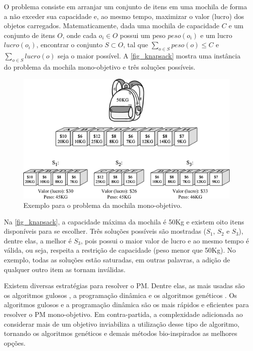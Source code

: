 O problema consiste em arranjar um conjunto de itens em uma mochila de forma a não exceder sua capacidade e, ao mesmo tempo, maximizar o valor (lucro) dos objetos carregados. Matematicamente, dada uma mochila de capacidade $C$ e um conjunto de itens $O$, onde cada $o_i \in O$ possui um peso $peso(o_i)$ e um lucro $lucro(o_i)$, encontrar o conjunto $S \subset O$, tal que $\sum_{o \in S} peso(o) \leq C$ e $\sum_{o \in S} lucro(o)$ seja o maior possível. A \autoref{fig_knapsack} mostra uma instância do problema da mochila mono-objetivo e três soluções possíveis.

\begin{figure}[!htbp]
	\centering
	\includegraphics[width=1\textwidth]{cap_problemas/figs/mochila.png}
	\caption{\label{fig_knapsack}Exemplo para o problema da mochila mono-objetivo.}
\end{figure}

Na \autoref{fig_knapsack}, a capacidade máxima da mochila é 50Kg e existem oito itens disponíveis para se escolher. Três soluções possíveis são mostradas ($S_1$, $S_2$ e $S_3$), dentre elas, a melhor é $S_3$, pois possui o maior valor de lucro e ao mesmo tempo é válida, ou seja, respeita a restrição de capacidade (peso menor que 50Kg). No exemplo, todas as soluções estão saturadas, em outras palavras, a adição de qualquer outro item as tornam inválidas.

Existem diversas estratégias para resolver o \ac{PM}. Dentre elas, as mais usadas são os algoritmos gulosos \cite{KnapsackGreedy}, a programação dinâmica \cite{KnapsackDynamic} e os algoritmos genéticos \cite{KnapsackGA}. Os algoritmos gulosos e a programação dinâmica são os mais rápidos e eficientes para resolver o PM mono-objetivo. Em contra-partida, a complexidade adicionada ao considerar mais de um objetivo inviabiliza a utilização desse tipo de algoritmo, tornando os algoritmos genéticos e demais métodos bio-inspirados as melhores opções.

